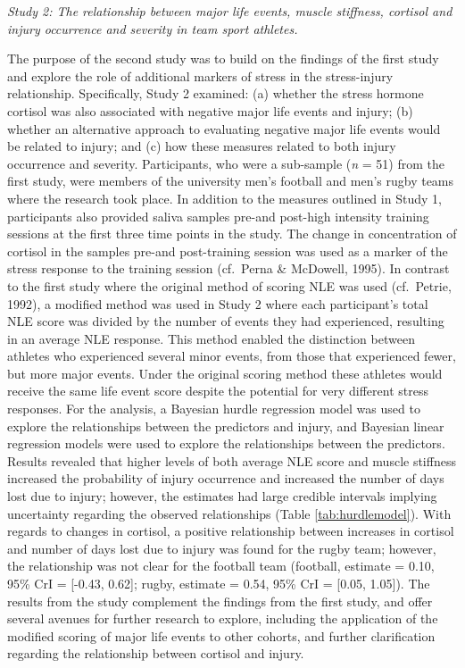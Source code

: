 \documentclass[
  english,
  man,floatsintext]{apa6}
\begin{document}
\emph{Study 2: The relationship between major life events, muscle stiffness, cortisol and injury occurrence and severity in team sport athletes. }

The purpose of the second study was to build on the findings of the first study and explore the role of additional markers of stress in the stress-injury relationship.
Specifically, Study 2 examined:
(a) whether the stress hormone cortisol was also associated with negative major life events and injury;
(b) whether an alternative approach to evaluating negative major life events would be related to injury; and
(c) how these measures related to both injury occurrence and severity.
Participants, who were a sub-sample (\emph{n} = 51) from the first study, were members of the university men's football and men's rugby teams where the research took place.
In addition to the measures outlined in Study 1, participants also provided saliva samples pre-and post-high intensity training sessions at the first three time points in the study.
The change in concentration of cortisol in the samples pre-and post-training session was used as a marker of the stress response to the training session (cf.~Perna \& McDowell, 1995).
In contrast to the first study where the original method of scoring NLE was used (cf.~Petrie, 1992), a modified method was used in Study 2 where each participant's total NLE score was divided by the number of events they had experienced, resulting in an average NLE response.
This method enabled the distinction between athletes who experienced several minor events, from those that experienced fewer, but more major events.
Under the original scoring method these athletes would receive the same life event score despite the potential for very different stress responses.
For the analysis, a Bayesian hurdle regression model was used to explore the relationships between the predictors and injury, and Bayesian linear regression models were used to explore the relationships between the predictors.
Results revealed that higher levels of both average NLE score and muscle stiffness increased the probability of injury occurrence and increased the number of days lost due to injury; however, the estimates had large credible intervals implying uncertainty regarding the observed relationships (Table \ref{tab:hurdlemodel}).
With regards to changes in cortisol, a positive relationship between increases in cortisol and number of days lost due to injury was found for the rugby team; however, the relationship was not clear for the football team (football, estimate = 0.10, 95\% CrI = {[}-0.43, 0.62{]}; rugby, estimate = 0.54, 95\% CrI = {[}0.05, 1.05{]}).
The results from the study complement the findings from the first study, and offer several avenues for further research to explore, including the application of the modified scoring of major life events to other cohorts, and further clarification regarding the relationship between cortisol and injury.
\end{document}
